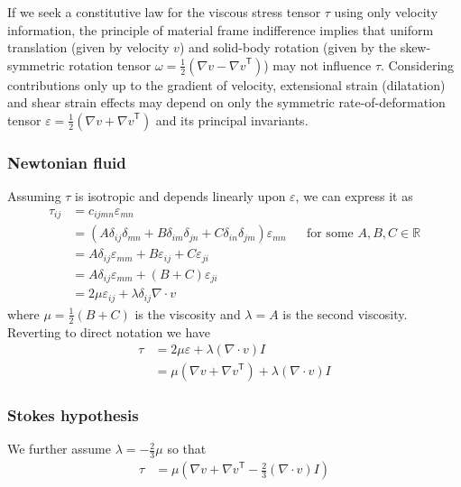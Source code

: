\documentclass[letterpaper,11pt,nointlimits]{amsart}
\newcommand{\trans}[1]{{#1}^{\ensuremath{\mathsf{T}}}}
\begin{document}
If we seek a constitutive law for the viscous
stress tensor $\tau$ using only velocity information, the principle
of material frame indifference implies that uniform translation (given by
velocity $v$) and solid-body rotation (given by the skew-symmetric
rotation tensor $\omega=\frac{1}{2}\left( \nabla{}v-\trans{\nabla{}v}
\right)$) may not influence $\tau$.  Considering contributions only up
to the gradient of velocity, extensional strain (dilatation) and shear
strain effects may depend on only the symmetric rate-of-deformation
tensor $\varepsilon=\frac{1}{2}\left( \nabla{}v+\trans{\nabla{}v}\right)$
and its principal invariants.

\subsubsection{Newtonian fluid}

Assuming $\tau$ is isotropic and depends linearly upon $\varepsilon$,
we can express it as
\begin{align}
\tau_{ij} 
  &= c_{ijmn} \varepsilon_{mn}
  \\
  &= \left( A \delta_{ij} \delta_{mn} 
          + B \delta_{im} \delta_{jn} 
          + C \delta_{in} \delta_{jm}
     \right) \varepsilon_{mn}
  &
  &\text{for some }A, B, C\in\mathbb{R}
  \\
  &= A \delta_{ij} \varepsilon_{mm} + B\varepsilon_{ij} + C\varepsilon_{ji}
  \\
  &= A \delta_{ij} \varepsilon_{mm} + \left( B+C \right)\varepsilon_{ji}
  \\
  &= 2 \mu \varepsilon_{ij} + \lambda\delta_{ij}\nabla\cdot{}v
\end{align}
where $\mu=\frac{1}{2}\left( B + C \right)$ is the viscosity
and $\lambda=A$ is the second viscosity.
Reverting to direct notation we have
\begin{align}
\tau 
  &= 2 \mu \varepsilon + \lambda \left( \nabla\cdot{}v \right) I
  \\
\label{eq:taunewt}
&=   \mu \left( \nabla{}v + \trans{\nabla{}v} \right) 
   + \lambda \left( \nabla\cdot{}v \right) I
\end{align}

\subsubsection{Stokes hypothesis}

We further assume $\lambda=-\frac{2}{3}\mu$ so that
\begin{align}
\tau &= \mu \left( 
    \nabla{}v + \trans{\nabla{}v} - \frac{2}{3} (\nabla\cdot{}v) I
  \right) 
\end{align}
\end{document}
